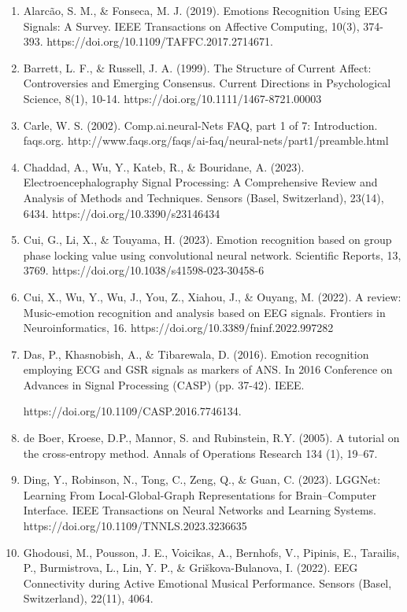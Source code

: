 \documentclass[fleqn,10pt]{SelfArx} %
\begin{document}
\begin{enumerate}
    \item  Alarcão, S. M., \& Fonseca, M. J. (2019). Emotions Recognition Using EEG Signals: A Survey. IEEE Transactions on Affective Computing, 10(3), 374-393. https://doi.org/10.1109/TAFFC.2017.2714671.
    \item Barrett, L. F., \& Russell, J. A. (1999). The Structure of Current Affect: Controversies and Emerging Consensus. Current Directions in Psychological Science, 8(1), 10-14. https://doi.org/10.1111/1467-8721.00003
    
    \item Carle, W. S. (2002). Comp.ai.neural-Nets FAQ, part 1 of 7: Introduction. faqs.org. http://www.faqs.org/faqs/ai-faq/neural-nets/part1/preamble.html 
    \item Chaddad, A., Wu, Y., Kateb, R., \& Bouridane, A. (2023). Electroencephalography Signal Processing: A Comprehensive Review and Analysis of Methods and Techniques. Sensors (Basel, Switzerland), 23(14), 6434. https://doi.org/10.3390/s23146434
    \item Cui, G., Li, X., \& Touyama, H. (2023). Emotion recognition based on group phase locking value using convolutional neural network. Scientific Reports, 13, 3769. https://doi.org/10.1038/s41598-023-30458-6
    \item Cui, X., Wu, Y., Wu, J., You, Z., Xiahou, J., \& Ouyang, M. (2022). A review: Music-emotion recognition and analysis based on EEG signals. Frontiers in Neuroinformatics, 16. https://doi.org/10.3389/fninf.2022.997282 
    \item   Das, P., Khasnobish, A., \& Tibarewala, D. (2016). Emotion recognition employing ECG and GSR signals as markers of ANS. In 2016 Conference on Advances in Signal Processing (CASP) (pp. 37-42). IEEE. 
    
    https://doi.org/10.1109/CASP.2016.7746134.

    \item de Boer, Kroese, D.P., Mannor, S. and Rubinstein, R.Y. (2005). A tutorial on the cross-entropy method. Annals of Operations Research 134 (1), 19–67.
    \item Ding, Y., Robinson, N., Tong, C., Zeng, Q., \& Guan, C. (2023). LGGNet: Learning From Local-Global-Graph Representations for Brain–Computer Interface. IEEE Transactions on Neural Networks and Learning Systems. https://doi.org/10.1109/TNNLS.2023.3236635

    \item Ghodousi, M., Pousson, J. E., Voicikas, A., Bernhofs, V., Pipinis, E., Tarailis, P., Burmistrova, L., Lin, Y. P., \& Griškova-Bulanova, I. (2022). EEG Connectivity during Active Emotional Musical Performance. Sensors (Basel, Switzerland), 22(11), 4064. 
    

\end{enumerate}
\end{document}
